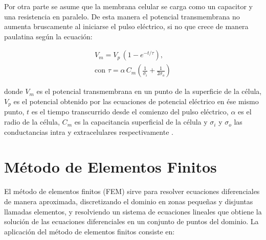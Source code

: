 \documentclass[11pt,a4paper,twoside]{tesis}
\begin{document}
Por otra parte se asume que la membrana celular se carga como un capacitor y una resistencia en paralelo. De esta manera el potencial transmembrana no aumenta bruscamente al iniciarse el pulso eléctrico, si no que crece de manera paulatina según la ecuación: 

\begin{equation} \label{eq:capacit} \begin{split}
	V_m = V_p\, (1 - e^{-t/\tau}) , \\ \textrm{con } \tau = \alpha\, C_m \left( \frac{1}{\sigma_i} + \frac{1}{2 \sigma_o} \right)
\end{split} \end{equation}

donde $V_m$ es el potencial transmembrana en un punto de la superficie de la célula, $V_p$ es el potencial obtenido por las ecuaciones de potencial eléctrico en ése mismo punto, $t$ es el tiempo transcurrido desde el comienzo del pulso eléctrico, $\alpha$ es el radio de la célula, $C_m$ es la capacitancia superficial de la célula y $\sigma_i$ y $\sigma_o$ las conductancias intra y extracelulares respectivamente \cite{krass}.\\

\section{Método de Elementos Finitos}
El método de elementos finitos (FEM) sirve para resolver ecuaciones diferenciales de manera aproximada, discretizando el dominio en zonas pequeñas y disjuntas llamadas elementos, y resolviendo un sistema de ecuaciones lineales que obtiene la solución de las ecuaciones diferenciales en un conjunto de puntos del dominio. La aplicación del método de elementos finitos consiste en: \cite{fem}
\end{document}
